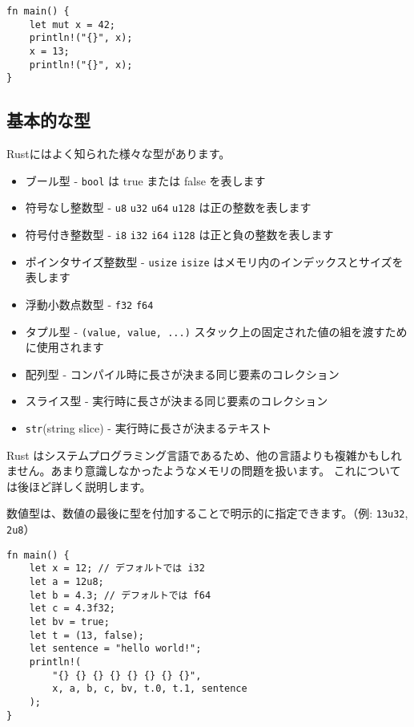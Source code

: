 \begin{verbatim}
fn main() {
    let mut x = 42;
    println!("{}", x);
    x = 13;
    println!("{}", x);
}
\end{verbatim}

\subsection{基本的な型}

Rustにはよく知られた様々な型があります。

\begin{itemize}
\item
  ブール型 - \texttt{bool} は true または false を表します
\item
  符号なし整数型 - \texttt{u8} \texttt{u32} \texttt{u64} \texttt{u128}
  は正の整数を表します
\item
  符号付き整数型 - \texttt{i8} \texttt{i32} \texttt{i64} \texttt{i128}
  は正と負の整数を表します
\item
  ポインタサイズ整数型 - \texttt{usize} \texttt{isize}
  はメモリ内のインデックスとサイズを表します
\item
  浮動小数点数型 - \texttt{f32} \texttt{f64}
\item
  タプル型 - \texttt{(value,\ value,\ ...)}
  スタック上の固定された値の組を渡すために使用されます
\item
  配列型 - コンパイル時に長さが決まる同じ要素のコレクション
\item
  スライス型 - 実行時に長さが決まる同じ要素のコレクション
\item
  \texttt{str}(string slice) - 実行時に長さが決まるテキスト
\end{itemize}

Rust
はシステムプログラミング言語であるため、他の言語よりも複雑かもしれません。あまり意識しなかったようなメモリの問題を扱います。
これについては後ほど詳しく説明します。

数値型は、数値の最後に型を付加することで明示的に指定できます。（例:
\texttt{13u32}, \texttt{2u8}）

\begin{verbatim}
fn main() {
    let x = 12; // デフォルトでは i32
    let a = 12u8;
    let b = 4.3; // デフォルトでは f64
    let c = 4.3f32;
    let bv = true;
    let t = (13, false);
    let sentence = "hello world!";
    println!(
        "{} {} {} {} {} {} {} {}",
        x, a, b, c, bv, t.0, t.1, sentence
    );
}
\end{verbatim}

